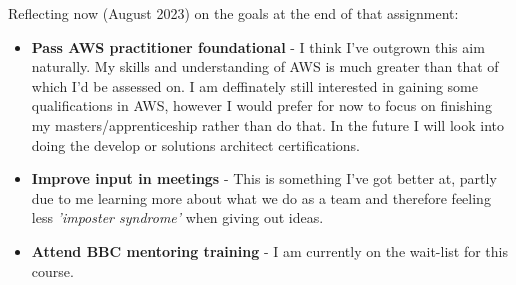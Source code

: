   Reflecting now (August 2023) on the goals at the end of that assignment:
  \begin{itemize}
    \item \textbf{Pass AWS practitioner foundational} - I think I've outgrown this aim naturally. My skills and understanding of AWS is much greater than
    that of which I'd be assessed on. I am deffinately still interested in gaining some qualifications in AWS, however I would prefer for now to focus on 
    finishing my masters/apprenticeship rather than do that. In the future I will look into doing the develop or solutions architect certifications.
    \item \textbf{Improve input in meetings} - This is something I've got better at, partly due to me learning more about what we do as a team and therefore
    feeling less \textit{'imposter syndrome'} when giving out ideas.
    \item \textbf{Attend BBC mentoring training} - I am currently on the wait-list for this course.
  \end{itemize}

\newpage